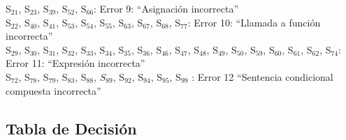S$_{21}$, S$_{23}$, S$_{39}$, S$_{52}$, S$_{66}$: Error 9: “Asignación incorrecta” \\

S$_{22}$, S$_{40}$, S$_{41}$, S$_{53}$, S$_{54}$, S$_{55}$, S$_{63}$, S$_{67}$, S$_{68}$, S$_{77}$: Error 10: “Llamada a función incorrecta”\\

S$_{29}$, S$_{30}$, S$_{31}$, S$_{32}$, S$_{33}$, S$_{34}$, S$_{35}$, S$_{36}$, S$_{46}$, S$_{47}$, S$_{48}$, S$_{49}$, S$_{50}$, S$_{59}$, S$_{60}$, S$_{61}$, S$_{62}$, S$_{74}$:\\
\indent Error 11: “Expresión incorrecta”\\

S$_{72}$, S$_{78}$, S$_{79}$, S$_{83}$, S$_{88}$, $S_{89}$, S$_{92}$, S$_{94}$, S$_{95}$, S$_{99}$ : Error 12 “Sentencia condicional compuesta incorrecta” \\

\subsection{Tabla de Decisión}

